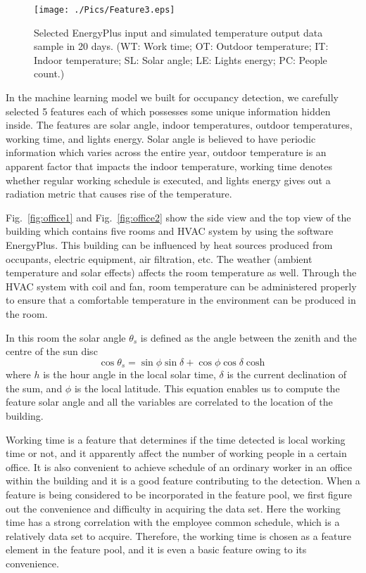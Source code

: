 \begin{figure}[h]
\centering
\texttt{[image: ./Pics/Feature3.eps]}
\caption{Selected EnergyPlus input and simulated temperature output data sample in 20 days. (WT: Work time; OT: Outdoor temperature; IT: Indoor temperature; SL: Solar angle; LE: Lights energy; PC: People count.)}
\label{fig:feature}
\end{figure}

In the machine learning model we built for occupancy detection, we
carefully selected 5 features each of which possesses some unique
information hidden inside. The features are solar angle, indoor
temperatures, outdoor temperatures, working time, and lights energy.
Solar angle is believed to have periodic information which varies
across the entire year, outdoor temperature is an apparent factor that
impacts the indoor temperature, working time denotes whether regular
working schedule is executed, and lights energy gives out a radiation
metric that causes rise of the temperature.

Fig.~\ref{fig:office1} and Fig.~\ref{fig:office2} show the side view
and the top view of the building which contains five rooms and HVAC
system by using the software EnergyPlus. This building can be
influenced by heat sources produced from occupants, electric
equipment, air filtration, etc. The weather (ambient temperature and
solar effects) affects the room temperature as well. Through the HVAC
system with coil and fan, room temperature can be administered
properly to ensure that a comfortable temperature in the environment
can be produced in the room.

In this room the solar angle ${\theta _s}$ is defined as the angle between the zenith and the centre of the sun disc
\[\cos {\theta _s} = \sin \phi \sin \delta  + \cos \phi \cos \delta \cosh \]
where $h$ is the hour angle in the local solar time, $\delta$ is the
current declination of the sum, and $\phi$ is the local latitude. This
equation enables us to compute the feature solar angle and all the
variables are correlated to the location of the building.

Working time is a feature that determines if the time detected is
local working time or not, and it apparently affect the number of
working people in a certain office. It is also convenient to achieve
schedule of an ordinary worker in an office within the building and it
is a good feature contributing to the detection. When a feature is
being considered to be incorporated in the feature pool, we first
figure out the convenience and difficulty in acquiring the data set.
Here the working time has a strong correlation with the employee common
schedule, which is a relatively data set to acquire. Therefore, the
working time is chosen as a feature element in the feature pool, and
it is even a basic feature owing to its convenience.

